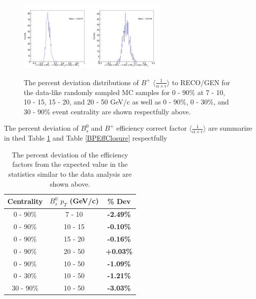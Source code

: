 \begin{figure}[h]
\begin{center}
\includegraphics[width= 0.32\textwidth]{Figures/Chapter5/BPEffONLY_30_90_-1.png}
\includegraphics[width= 0.32\textwidth]{Figures/Chapter5/BPEffONLY_0_90_-1.png} 
\caption{The percent deviation distributions of $B^+$ $\langle \frac{1}{\alpha \times \epsilon}\rangle$ to RECO/GEN for the data-like randomly sampled MC samples for 0 - 90\% at 7 - 10, 10 - 15, 15 - 20, and 20 - 50 GeV/c as well as 0 - 90\%, 0 - 30\%, and 30 - 90\% event centrality are shown respectfully above.} 
\label{BPLowStatFig} 
\end{center}
\end{figure}



The percent deviation of $B^0_s$ and $B^+$ efficiency correct factor $\langle \frac{1}{\alpha \times \epsilon}\rangle$ are summarize in thed Table \ref{BsEffClosure} and Table \ref{BPEffClosure} respectfully


\begin{table}[h]
\begin{center}
\caption{The percent deviation of the efficiency factors from the expected value in the statistics similar to the data analysis are shown above.}
\vspace{1em}
\label{BsEffClosure}
  \begin{tabular}{| c | c |c |}
    \hline
     Centrality &   $B^0_s$  $p_T$ (GeV/c) &   \% Dev \\
    \hline
    \hline
0 - 90\% & 7 - 10 &  \textbf{-2.49\% }   \\ 
0 - 90\% & 10 - 15 &  \textbf{-0.10\% }   \\ 
0 - 90\% & 15 - 20 &   \textbf{-0.16\% }   \\ 
0 - 90\% & 20 - 50 &  \textbf{+0.03\% }   \\ 
0 - 90\% & 10 - 50 &  \textbf{-1.09\% }   \\ 
0 - 30\% & 10 - 50 &   \textbf{-1.21\% }   \\ 
30 - 90\% & 10 - 50 & \textbf{-3.03\% }   \\ 
    \hline
    \hline
\end{tabular}
\end{center}
\end{table}

